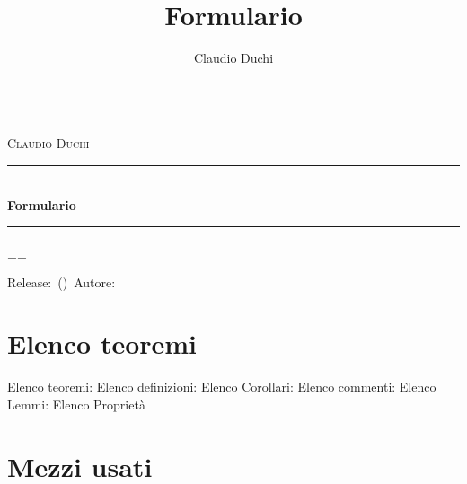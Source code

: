 \documentclass[a4paper,oneside]{book}%
\title{Formulario}
\author{Claudio Duchi}
\date{\datetime}
\makeatletter
\theoremstyle{marginbreak}
\theoremstyle{plain}
\theoremstyle{nonumberplain}
\newcommand{\HRule}{\rule{\linewidth}{0.5mm}}
\renewcommand\frontmatter{%
 	\cleardoublepage
 	\@mainmatterfalse
 }
\renewcommand\mainmatter{%
 	\cleardoublepage
 	\@mainmattertrue
 }
\makeatother
\begin{document}
		\frontmatter
		\begin{titlepage}\parindent=0pt
		\begin{center}
					\Lgrandedue\\[1cm]
			\textsc{\LARGE Claudio Duchi}\\[1.2cm]
				\HRule \\[0.4cm]
				{ \huge \bfseries Formulario}\\[0.4cm]
				\HRule \\[1.2cm]
				\vfill
			{\large $-$\DTMnow$-$}	
		\end{center}
		{\centering
	Release:\gitReln\ (\gitAbbrevHash)\ Autore:\gitAuthorName\ 
	\gitCommitterDate \\
}
		\end{titlepage}
	\hypersetup{pageanchor=true}
	\CDcopyright
		\tableofcontents
		\listoffigures
			\listoftables
		\chapter*{Elenco teoremi}
	Elenco teoremi:
	Elenco definizioni:
	Elenco Corollari:
	Elenco commenti:
	Elenco Lemmi:
	Elenco Proprietà
			\mainmatter
		
\backmatter	
 \printindex
\appendix
\chapter{Mezzi usati}
\CDMezziUsati
	\twocolumn
\glsaddall
\printglossaries
\onecolumn
\nocite{*}
\printbibliography
\end{document}
